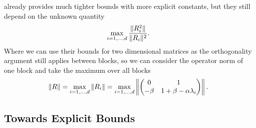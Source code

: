 \textcite{kozyakinAccuracyApproximationSpectral2009} already provides much tighter
bounds with more explicit constants, but they still depend on the unknown quantity
\begin{align*}
	\max_{i=1,\dots,d}\frac{\|R_i^2\|}{\|R_i\|^2}.
\end{align*}
Where we can use their bounds for two dimensional matrices as the orthogonality
argument still applies between blocks, so we can consider the operator norm of
one block and take the maximum over all blocks
\begin{align*}
	\|R\| = \max_{i=1,\dots,d}\|R_i\|
	= \max_{i=1,\dots,d}\left\|
	\begin{pmatrix}
		0 & 1 \\
		-\beta & 1+\beta-\alpha\lambda_i
	\end{pmatrix}
	\right\|.
\end{align*}

\subsection{Towards Explicit Bounds}

